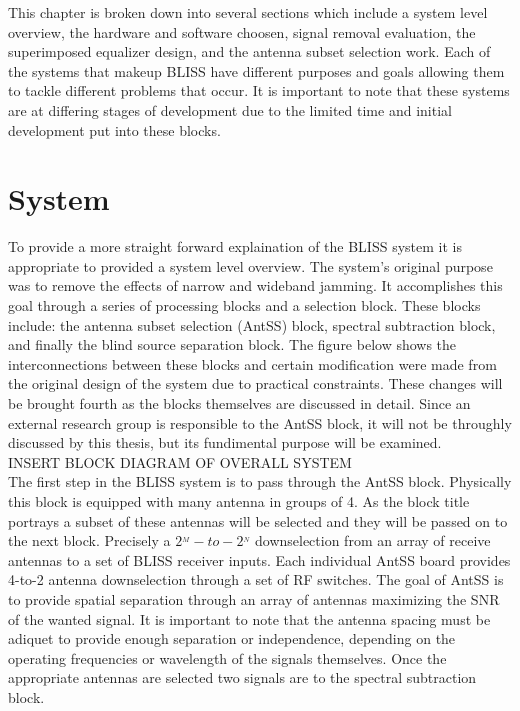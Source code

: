 This chapter is broken down into several sections which include a system level overview, the hardware and software choosen, signal removal evaluation, the superimposed equalizer design, and the antenna subset selection work.  Each of the systems that makeup BLISS have different purposes and goals allowing them to tackle different problems that occur.  It is important to note that these systems are at differing stages of development due to the limited time and initial development put into these blocks.\\ 

\section{System}

To provide a more straight forward explaination of the BLISS system it is appropriate to provided a system level overview.  The system's original purpose was to remove the effects of narrow and wideband jamming.  It accomplishes this goal through a series of processing blocks and a selection block.  These blocks include: the antenna subset selection (AntSS) block, spectral subtraction block, and finally the blind source separation block.  The figure below shows the interconnections between these blocks and certain modification were made from the original design of the system due to practical constraints.  These changes will be brought fourth as the blocks themselves are discussed in detail. Since an external research group is responsible to the AntSS block, it will not be throughly discussed by this thesis, but its fundimental purpose will be examined.\\

INSERT BLOCK DIAGRAM OF OVERALL SYSTEM\\

The first step in the BLISS system is to pass through the AntSS block.  Physically this block is equipped with many antenna in groups of 4.  As the block title portrays a subset of these antennas will be selected and they will be passed on to the next block.  Precisely a \(2^_{M}-to-2^_{N}\) downselection from an array of receive antennas to a set of BLISS receiver inputs. Each individual AntSS board provides 4-to-2 antenna downselection through a set of RF switches.  The goal of AntSS is to provide spatial separation through an array of antennas maximizing the SNR of the wanted signal.  It is important to note that the antenna spacing must be adiquet to provide enough separation or independence, depending on the operating frequencies or wavelength of the signals themselves.  Once the appropriate antennas are selected two signals are to the spectral subtraction block.\\

